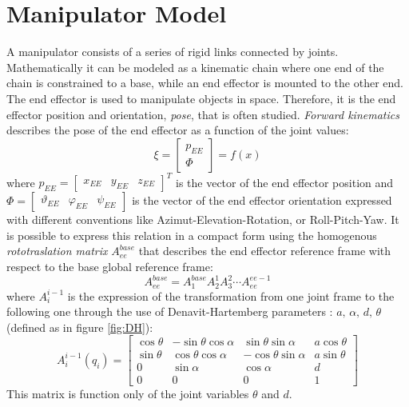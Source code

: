 \section{Manipulator Model}
A manipulator consists of a series of rigid links connected by joints. Mathematically it can be modeled as a kinematic chain where one end of the chain is constrained to a base, while an end effector is mounted to the other end. The end effector is used to manipulate objects in space. Therefore, it is the end effector position and orientation, \textit{pose}, that is often studied. \textit{Forward kinematics} describes the pose of the end effector as a function of the joint values:
\begin{equation}
 	\xi=\left[\begin{matrix}p_{EE}\\\Phi\end{matrix}\right]=f(x)
\end{equation} 
where $p_{EE}=\left[\begin{matrix}x_{EE}&y_{EE}&z_{EE}\end{matrix}\right]^T$ is the vector of the end effector position and $\Phi =\left[\begin{matrix}\vartheta_{EE}&\varphi_{EE}&\psi_{EE}\end{matrix}\right]$ is the vector of the end effector orientation expressed with different conventions like Azimut-Elevation-Rotation, or Roll-Pitch-Yaw. 
It is possible to express this relation in a compact form using the homogenous \textit{rototraslation matrix} $A_{ee}^{base}$ that describes the end effector reference frame with respect to the base global reference frame:
\begin{equation}\label{AAAA_man}
A_{ee}^{base}=A_1^{base}A_2^1A_3^2\cdots A_{ee}^{ee-1}
\end{equation}
where $A_i^{i-1}$ is the expression of the transformation from one joint frame to the following one through the use of Denavit-Hartemberg parameters \cite{DH}: $a\text{, }\alpha\text{, }d\text{, }\theta$ (defined as in figure \ref{fig:DH}):
\begin{equation}
A_i^{i-1}(q_i)=\left[
\begin{matrix}
\cos\theta & -\sin\theta\cos\alpha & \sin\theta\sin\alpha & a\cos\theta \\
\sin\theta & \cos\theta\cos\alpha & -\cos\theta\sin\alpha & a\sin\theta \\
0 & \sin\alpha & \cos\alpha & d \\
0 & 0 & 0 & 1
\end{matrix}
\right]
\end{equation}
This matrix is function only of the joint variables $\theta$ and $d$.

